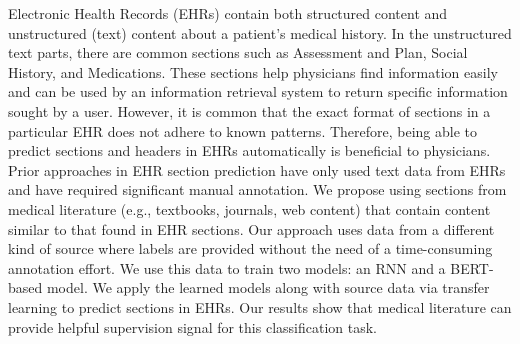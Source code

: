 Electronic Health Records (EHRs) contain both structured content and unstructured (text) content about a patient's medical history. In the unstructured text parts, there are common sections such as Assessment and Plan, Social History, and Medications. These sections help physicians find information easily and can be used by an information retrieval system to return specific information sought by a user. However, it is common that the exact format of sections in a particular EHR does not adhere to known patterns. Therefore, being able to predict sections and headers in EHRs automatically is beneficial to physicians. Prior approaches in EHR section prediction have only used text data from EHRs and have required significant manual annotation. We propose using sections from medical literature (e.g., textbooks, journals, web content) that contain content similar to that found in EHR sections. Our approach uses data from a different kind of source where labels are provided without the need of a time-consuming annotation effort. We use this data to train two models: an RNN and a BERT-based model. We apply the learned models along with source data via transfer learning to predict sections in EHRs. Our results show that medical literature can provide helpful supervision signal for this classification task.